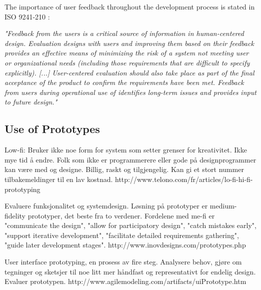 The importance of user feedback throughout the development process is stated in ISO 9241-210 \cite{dis20109241}:

\emph{"Feedback from the users is a critical source of information in human-centered design. Evaluation designs with users and improving them based on their feedback provides an effective means of minimizing the risk of a system not meeting user or organizational needs (including those requirements that are difficult to specify explicitly).  [...] User-centered evaluation should also take place as part of the final acceptance of the product to confirm the requirements have been met. Feedback from users during operational use of identifies long-term issues and provides input to future design."}

\subsection{Use of Prototypes}
\label{sec:prototypes}
Low-fi: Bruker ikke noe form for system som setter grenser for kreativitet. Ikke mye tid å endre. Folk som ikke er programmerere eller gode på designprogrammer kan være med og designe. Billig, raskt og tilgjengelig. Kan gi et stort nummer tilbakemeldinger til en lav kostnad. http://www.telono.com/fr/articles/lo-fi-hi-fi-prototyping

Evaluere funksjonalitet og systemdesign. Løsning på prototyper er medium-fidelity prototyper, det beste fra to verdener. Fordelene med me-fi er "communicate the design", "allow for participatory design", "catch mistakes early", "support iterative development", "facilitate detailed requirements gathering", "guide later development stages". http://www.inovdesigns.com/prototypes.php 

User interface prototyping, en prosess av fire steg. Analysere behov, gjøre om tegninger og sketsjer til noe litt mer håndfast og representativt for endelig design. Evaluer prototypen. http://www.agilemodeling.com/artifacts/uiPrototype.htm

